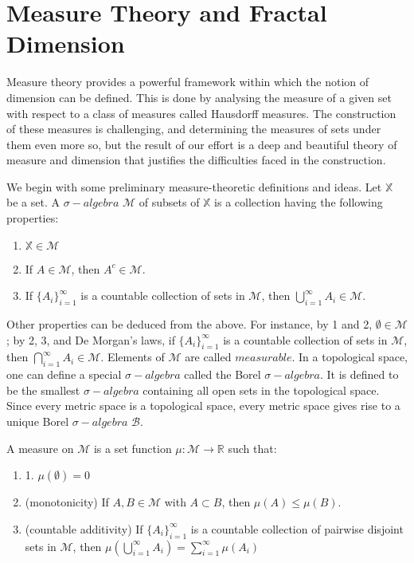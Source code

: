 \chapter{Measure Theory and Fractal Dimension}
\label{chap:measure}

Measure theory provides a powerful framework within which the notion of
dimension can be defined. This is done by analysing the measure of a given
set with respect to a class of measures called Hausdorff measures. The
construction of these measures is challenging, and determining the measures
of sets under them even more so, but the result of our effort is a deep and
beautiful theory of measure and dimension that justifies the difficulties
faced in the construction.

We begin with some preliminary measure-theoretic definitions and ideas. Let
$\mathbb{X}$ be a set. A $\sigma-algebra$ $\mathcal{M}$ of subsets of
$\mathbb{X}$ is a collection having the following properties:
   
\begin{enumerate} 
  \item $\mathbb{X} \in \mathcal{M}$

  \item If $A \in \mathcal{M}$, then ${A}^c \in \mathcal{M}$.

  \item If $\{A_i\}^\infty_{i=1}$ is a countable collection of sets in
    $\mathcal{M}$, then $\bigcup\limits_{i=1}^{\infty}A_i \in \mathcal{M}$.
\end{enumerate}

Other properties can be deduced from the above. For instance, by 1 and 2,
$\emptyset \in \mathcal{M}$; by 2, 3, and De Morgan's laws, if
$\{A_i\}^\infty_{i=1}$ is a countable collection of sets in $\mathcal{M}$,
then $\bigcap\limits_{i=1}^{\infty}A_i \in \mathcal{M}$. Elements of
$\mathcal{M}$ are called $measurable$. In a topological space, one can define
a special $\sigma-algebra$ called the Borel $\sigma-algebra$. It is defined
to be the smallest $\sigma-algebra$ containing all open sets in the
topological space. Since every metric space is a topological space, every
metric space gives rise to a unique Borel $\sigma-algebra$ $\mathcal{B}$.

A measure on $\mathcal{M}$ is a set function $\mu:\mathcal{M}\rightarrow\mathbb{R}$ such that:
  
\begin{enumerate}
  \item{1.} $\mu(\emptyset)=0$

  \item{(monotonicity)} If $A,B \in \mathcal{M}$ with $A \subset B$, then
    $\mu(A)\leq\mu(B)$.

  \item{(countable additivity)} If $\{A_i\}^\infty_{i=1}$ is a countable
    collection of pairwise disjoint sets in $\mathcal{M}$, then
    $\mu(\bigcup\limits_{i=1}^{\infty}A_i)=\sum\limits_{i=1}^{\infty}\mu(A_i)$
\end{enumerate} 

